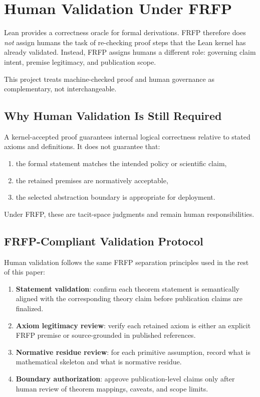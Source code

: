 \section{Human Validation Under FRFP}
\label{sec:human_validation}

Lean provides a correctness oracle for formal derivations. FRFP therefore does
\emph{not} assign humans the task of re-checking proof steps that the Lean
kernel has already validated. Instead, FRFP assigns humans a different role:
governing claim intent, premise legitimacy, and publication scope.

This project treats machine-checked proof and human governance as complementary,
not interchangeable.

\subsection{Why Human Validation Is Still Required}

A kernel-accepted proof guarantees internal logical correctness relative to
stated axioms and definitions. It does not guarantee that:
\begin{enumerate}
  \item the formal statement matches the intended policy or scientific claim,
  \item the retained premises are normatively acceptable,
  \item the selected abstraction boundary is appropriate for deployment.
\end{enumerate}

Under FRFP, these are tacit-space judgments and remain human responsibilities.

\subsection{FRFP-Compliant Validation Protocol}

Human validation follows the same FRFP separation principles used in the rest of
this paper:
\begin{enumerate}
  \item \textbf{Statement validation}: confirm each theorem statement is semantically
    aligned with the corresponding theory claim before publication claims
    are finalized.
  \item \textbf{Axiom legitimacy review}: verify each retained axiom is either an
        explicit FRFP premise or source-grounded in published references.
  \item \textbf{Normative residue review}: for each primitive assumption, record what
        is mathematical skeleton and what is normative residue.
  \item \textbf{Boundary authorization}: approve publication-level claims only after
        human review of theorem mappings, caveats, and scope limits.
\end{enumerate}

